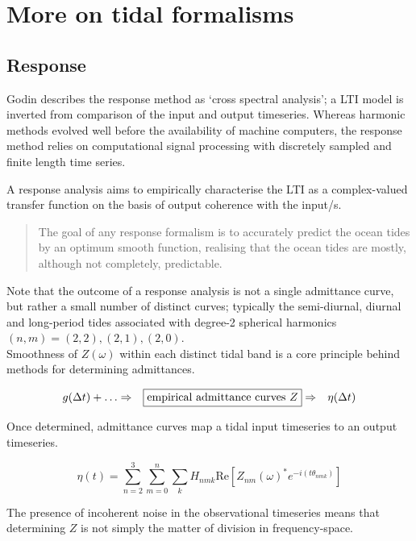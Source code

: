 
\chapter{More on tidal formalisms}
\label{appendix:response}

\section{Response}
Godin \citep{Godin:1991vx} describes the response method as `cross spectral analysis'; a LTI model is inverted from comparison of the input and output timeseries.   
Whereas harmonic methods evolved well before the availability of machine computers, the response method relies on computational signal processing with discretely sampled and finite length time series.


A response analysis aims to empirically characterise the LTI as a complex-valued transfer function on the basis of output coherence with the input/s. 
\begin{quotation}
The goal of any response formalism is to accurately predict the ocean tides by an optimum smooth function, realising that the ocean tides are mostly, although not completely, predictable.
\end{quotation}

Note that the outcome of a response analysis is not a single admittance curve, but rather a small number of distinct curves; typically the semi-diurnal, diurnal and long-period tides associated with degree-2 spherical harmonics $(n,m)=(2,2),(2,1),(2,0)$.\\
Smoothness of $Z(\omega)$ within each distinct tidal band is a core principle behind methods for determining admittances.  

\begin{align}
\label{E:response}
g(\Delta t) + \dots &\Rightarrow & \fbox{empirical admittance curves $Z$} &\Rightarrow & \mbox{$\eta(\Delta t)$}  %
\end{align}

Once determined, admittance curves map a tidal input timeseries to an output timeseries.

\begin{equation}
\label{E:Z}
\eta(t) = \sum_{n=2}^{3}\sum_{m=0}^{n}\sum_{k} H_{nmk} \text{Re} \left[ Z_{nm}(\omega)^*e^{-i(t\theta_{nmk})} \right] 
\end{equation}


The presence of incoherent noise in the observational timeseries means that determining $Z$ is not simply the matter of division in frequency-space.\\




